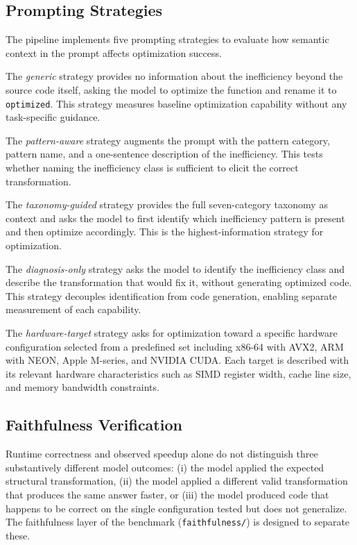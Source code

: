 \subsection{Prompting Strategies}

The pipeline implements five prompting strategies to evaluate how semantic context in the prompt affects optimization success.

The \textit{generic} strategy provides no information about the inefficiency beyond the source code itself, asking the model to optimize the function and rename it to \texttt{optimized}. This strategy measures baseline optimization capability without any task-specific guidance.

The \textit{pattern-aware} strategy augments the prompt with the pattern category, pattern name, and a one-sentence description of the inefficiency. This tests whether naming the inefficiency class is sufficient to elicit the correct transformation.

The \textit{taxonomy-guided} strategy provides the full seven-category taxonomy as context and asks the model to first identify which inefficiency pattern is present and then optimize accordingly. This is the highest-information strategy for optimization.

The \textit{diagnosis-only} strategy asks the model to identify the inefficiency class and describe the transformation that would fix it, without generating optimized code. This strategy decouples identification from code generation, enabling separate measurement of each capability.

The \textit{hardware-target} strategy asks for optimization toward a specific hardware configuration selected from a predefined set including x86-64 with AVX2, ARM with NEON, Apple M-series, and NVIDIA CUDA. Each target is described with its relevant hardware characteristics such as SIMD register width, cache line size, and memory bandwidth constraints.

\subsection{Faithfulness Verification}\label{subsec:faithfulness}

Runtime correctness and observed speedup alone do not distinguish three substantively different model outcomes: (i) the model applied the expected structural transformation, (ii) the model applied a different valid transformation that produces the same answer faster, or (iii) the model produced code that happens to be correct on the single configuration tested but does not generalize. The faithfulness layer of the benchmark (\texttt{faithfulness/}) is designed to separate these.

